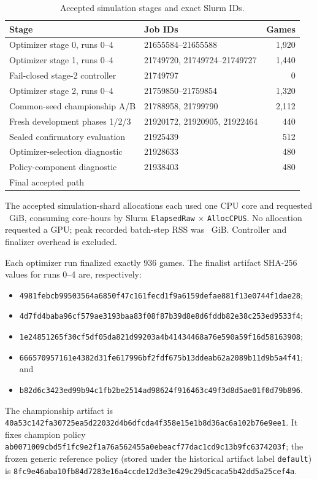 \begin{table}[ht]
\centering
\caption{Accepted simulation stages and exact Slurm IDs.}
\label{tab:supp-ledger}
\scriptsize
\begin{tabular}{@{}p{4.1cm}p{6.8cm}r@{}}
\toprule
Stage & Job IDs & Games \\
\midrule
Optimizer stage 0, runs 0--4 & 21655584--21655588 & 1,920 \\
Optimizer stage 1, runs 0--4 & 21749720, 21749724--21749727 & 1,440 \\
Fail-closed stage-2 controller & 21749797 & 0 \\
Optimizer stage 2, runs 0--4 & 21759850--21759854 & 1,320 \\
Common-seed championship A/B & 21788958, 21799790 & 2,112 \\
Fresh development phases 1/2/3 & 21920172, 21920905, 21922464 & 440 \\
Sealed confirmatory evaluation & 21925439 & 512 \\
Optimizer-selection diagnostic & 21928633 & 480 \\
Policy-component diagnostic & 21938403 & 480 \\
\midrule
Final accepted path & & \TotalGameCount{} \\
\bottomrule
\end{tabular}
\end{table}

The \AcceptedAllocationCount{} accepted simulation-shard allocations each used
one CPU core and requested \AcceptedRequestedMemoryGiB{}~GiB, consuming
\AcceptedCoreHours{} core-hours by Slurm
\texttt{ElapsedRaw} $\times$ \texttt{AllocCPUS}.
No allocation requested a GPU; peak recorded batch-step RSS was
\AcceptedPeakRSSGiB{}~GiB. Controller and finalizer overhead is excluded.

Each optimizer run finalized exactly 936 games. The finalist artifact SHA-256
values for runs 0--4 are, respectively:
{\small
\begin{itemize}
  \item \nolinkurl{4981febcb99503564a6850f47c161fecd1f9a6159defae881f13e0744f1dae28};
  \item \nolinkurl{4d7fd4baba96cf579ae3193baa83f08f87b39d8e8d6fddb82e38c253ed9533f4};
  \item \nolinkurl{1e24851265f30cf5df05da821d99203a4b41434468a76e590a59f16d58163908};
  \item \nolinkurl{666570957161e4382d31fe617996bf2fdf675b13ddeab62a2089b11d9b5a4f41}; and
  \item \nolinkurl{b82d6c3423ed99b94c1fb2be2514ad98624f916463c49f3d8d5ae01f0d79b896}.
\end{itemize}
}
The championship artifact is
\nolinkurl{40a53c142fa30725ea5d22032d4b6dfcda4f358e15e1b8d36ac6a102b76e9ee1}.
It fixes champion policy
\nolinkurl{ab0071009cbd5f1fc9e2f1a76a562455a0ebeacf77dac1cd9c13b9fc6374203f};
the frozen generic reference policy (stored under the historical artifact
label \texttt{default}) is
\nolinkurl{8fc9e46aba10fb84d7283e16a4ccde12d3e3e429c29d5caca5b42dd5a25cef4a}.

